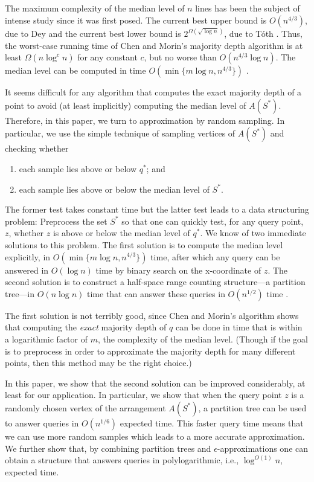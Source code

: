 \documentclass{cccg12}
\begin{document}
The maximum complexity of the median level of $n$ lines has been the
subject of intense study since it was first posed.  The current best
upper bound is $O(n^{4/3})$, due to Dey \cite{d98} and the current best
lower bound is $2^{\Omega(\sqrt{\log n})}$, due to T\'oth \cite{t00}.
Thus, the worst-case running time of Chen and Morin's majority depth
algorithm is at least $\Omega(n\log^c n)$ for any constant $c$, but
no worse than $O(n^{4/3}\log n)$.  The median level can be computed in
time $O(\min\{m\log n,n^{4/3}\})$ \cite{bj02,c99}.

It seems difficult for any algorithm that computes the exact majority
depth of a point to avoid (at least implicitly) computing the median
level of $A(S^*)$.  Therefore, in this paper, we turn to approximation by
random sampling.  In particular, we use the simple technique of sampling
vertices of $A(S^*)$ and checking whether
\begin{enumerate}
  \item each sample lies above or below $q^*$; and
  \item each sample lies above or below the median level of $S^*$.
\end{enumerate}

The former test takes constant time but the latter test leads to a
data structuring problem:  Preprocess the set $S^*$ so that one can
quickly test, for any query point, $z$, whether $z$ is above or below
the median level of $q^*$.   We know of two immediate solutions to this
problem.  The first solution is to compute the median level explicitly,
in $O(\min\{m\log n,n^{4/3}\})$ time, after which any query can be
answered in $O(\log n)$ time by binary search on the x-coordinate of
$z$.  The second solution is to construct a half-space range counting
structure---a partition tree---in $O(n\log n)$ time that can answer
these queries in $O(n^{1/2})$ time \cite{c12}.

The first solution is not terribly good, since Chen and Morin's algorithm
shows that computing the \emph{exact} majority depth of $q$ can be done
in time that is within a logarithmic factor of $m$, the complexity of
the median level.  (Though if the goal is to preprocess in order to
approximate the majority depth for many different points, then this
method may be the right choice.)

In this paper, we show that the second solution can be improved
considerably, at least for our application.  In particular, we show that
when the query point $z$ is a randomly chosen vertex of the arrangement
$A(S^*)$, a partition tree can be used to answer queries in $O(n^{1/6})$
expected time.  This faster query time means that we can use more random
samples which leads to a more accurate approximation.  We further show
that, by combining partition trees and $\epsilon$-approximations
\cite{c04} one can obtain a structure that answers queries in
polylogarithmic, i.e., $\log^{O(1)} n$, expected time.
\end{document}
